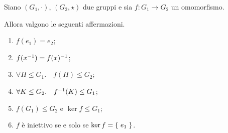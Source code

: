 \begin{proposition}
     \label{prop:prop_omo}
    Siano $(G_1, \cdot)$, $(G_2, \star)$ due gruppi e sia $f : G_1 \to G_2$ un omomorfismo.

    Allora valgono le seguenti affermazioni.
    \begin{enumerate}[label={(\roman*)}, ref={\theproposition: (\roman*)}]
        \item \label{prop:prop_omo:e_va_in_e'}$f(e_1) = e_2$;
        \item \label{prop:prop_omo:inv_passa_dentro}$f(x^{-1}) = f(x)^{-1}$;
        \item \label{prop:prop_omo:f(H)_sgr_cod}$\forall H \leq G_1. \quad f(H) \leq G_2$;
        \item \label{prop:prop_omo:f\inv(K)_sgr_dom} $\forall K \leq G_2. \quad f^{-1}(K) \leq G_1$;
        \item \label{prop:prop_omo:imm_ker_sgr}$f(G_1) \leq G_2$ e $\ker f \leq G_1$;
        \item \label{prop:prop_omo:cond_iniett}$f$ è iniettivo se e solo se $\ker f = \left\{\;e_1\;\right\}$.
    \end{enumerate}
\end{proposition}
